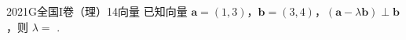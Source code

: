 
\begin{problem}{2021}{G}{全国I卷（理）}{14}{向量}
已知向量 $ \boldsymbol{a}=(1,3) $，$ \boldsymbol{b}=(3,4) $，$ (\boldsymbol{a}-\lambda\boldsymbol{b})\perp\boldsymbol{b} $，则 $ \lambda= $ \underline{\hspace{4em}}.
\end{problem}

\begin{answer}

\end{answer}

\begin{solutions}

\end{solutions}
